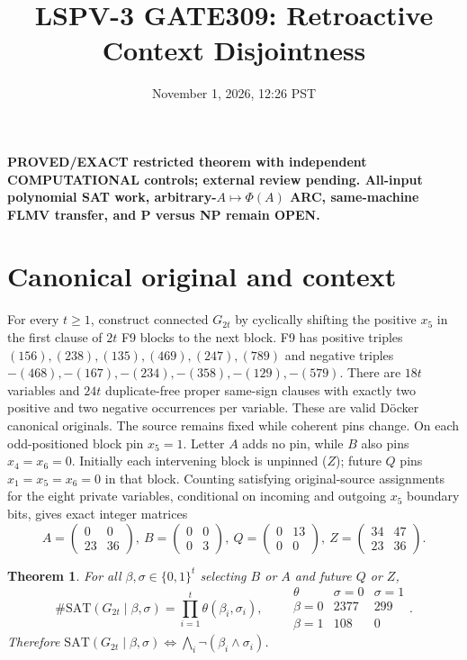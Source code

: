 \documentclass[11pt]{article}
\title{LSPV-3 GATE309: Retroactive Context Disjointness}
\date{November 1, 2026, 12:26 PST}
\newtheorem{theorem}{Theorem}
\begin{document}
\maketitle
\noindent\textbf{PROVED/EXACT restricted theorem with independent COMPUTATIONAL controls; external review pending. All-input polynomial SAT work, arbitrary-$A\mapsto\Phi(A)$ ARC, same-machine FLMV transfer, and P versus NP remain OPEN.}
\section{Canonical original and context}
For every $t\ge1$, construct connected $G_{2t}$ by cyclically shifting the positive $x_5$ in the first clause of $2t$ F9 blocks to the next block. F9 has positive triples $(156),(238),(135),(469),(247),(789)$ and negative triples $-(468),-(167),-(234),-(358),-(129),-(579)$. There are $18t$ variables and $24t$ duplicate-free proper same-sign clauses with exactly two positive and two negative occurrences per variable. These are valid D\"ocker canonical originals. The source remains fixed while coherent pins change.
On each odd-positioned block pin $x_5=1$. Letter $A$ adds no pin, while $B$ also pins $x_4=x_6=0$. Initially each intervening block is unpinned ($Z$); future $Q$ pins $x_1=x_5=x_6=0$ in that block. Counting satisfying original-source assignments for the eight private variables, conditional on incoming and outgoing $x_5$ boundary bits, gives exact integer matrices
\[
A=\begin{pmatrix}0&0\\23&36\end{pmatrix},\
B=\begin{pmatrix}0&0\\0&3\end{pmatrix},\
Q=\begin{pmatrix}0&13\\0&0\end{pmatrix},\
Z=\begin{pmatrix}34&47\\23&36\end{pmatrix}.
\]
\begin{theorem}
For all $\beta,\sigma\in\{0,1\}^t$ selecting $B$ or $A$ and future $Q$ or $Z$,
\[
\#\mathrm{SAT}(G_{2t}\mid\beta,\sigma)=\prod_{i=1}^t\theta(\beta_i,\sigma_i),\qquad
\begin{array}{c|cc}
\theta&\sigma=0&\sigma=1\\\hline
\beta=0&2377&299\\
\beta=1&108&0
\end{array}.
\]
Therefore $\mathrm{SAT}(G_{2t}\mid\beta,\sigma)\iff\bigwedge_i\neg(\beta_i\land\sigma_i)$.
\end{theorem}
\end{document}
